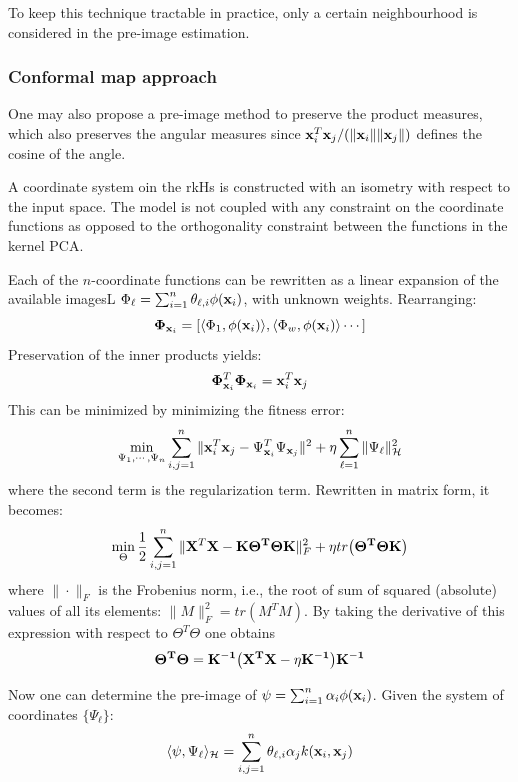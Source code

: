 To keep this technique tractable in practice, only a certain neighbourhood is considered in the pre-image estimation.
\subsubsection{Conformal map approach}
One may also propose a pre-image method to preserve the product measures, which also preserves the angular measures since  $\x_i^T \x_j/\br{\|\x_i\|\|\x_j\|}$ defines the cosine of the angle.

A coordinate system oin the rkHs is constructed with an isometry with respect to the input space. The model is not coupled with any constraint on the coordinate functions as opposed to the orthogonality constraint between the functions in the kernel PCA. 

Each of the $n$-coordinate functions can be rewritten as a linear expansion of the available imagesL $\Phi_\ell = \sum_{i=1}^n \theta_{\ell, i}\phi(\mathbf{x}_i)$, with unknown weights. Rearranging:
\begin{equation}
\mathbf{\Phi}_{\mathbf{x}_i} = \left[ \langle \Phi_1, \phi(\mathbf{x}_i)\rangle,  \langle \Phi_w, \phi(\mathbf{x}_i)\rangle \cdots\right]
\end{equation}
Preservation of the inner products yields:
\begin{equation}
\mathbf{\Phi}_{\mathbf{x}_i}^T\mathbf{\Phi}_{\mathbf{x}_i}= \mathbf{x}_i^T\mathbf{x}_j
\end{equation}
This can be minimized by minimizing the fitness error:
\begin{equation}
\min_{\Psi_1, \cdots, \Psi_n}{\sum_{i,j=1}^n \|\x_i^T\x_j - \Psi_{\x_i}^T\Psi_{\x_j}\|^2 + \eta \sum_{\ell=1}^n \|\Psi_\ell\|^2_{\CMcal{H}}}
\end{equation}
where the second term is the regularization term. Rewritten in matrix form, it becomes:
\begin{equation}
\min_{\Theta} \frac{1}{2}\sum_{i,j=1}^n \|\X^T\X - \mathbf{K\Theta^T\Theta K}\|^2_F + \eta tr\br{\mathbf{\Theta^T\Theta K}}
\end{equation}
where $\|\cdot\|_F$ is the Frobenius norm, i.e., the root of sum of squared (absolute) values of all its elements: $\|M\|^2_F=tr(M^TM)$. By taking the derivative of this expression with respect to $\Theta^T\Theta$ one obtains
\begin{equation}
\mathbf{\Theta^T\Theta = K^{-1}\br{X^TX-\eta K^{-1}}K^{-1}}
\end{equation}

Now one can determine the pre-image of $\psi = \sum_{i=1}^n\alpha_i \phi(\mathbf{x}_i)$. Given the system of coordinates $\{\Psi_\ell\}$:
\begin{equation}
\langle \psi, \Psi_\ell\rangle_\CMcal{H} = \sum_{i,j=1}^n \theta_{\ell,i}\alpha_j k(\x_i, \x_j)
\end{equation}

